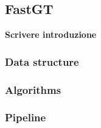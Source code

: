 \documentclass[../main.tex]{subfiles}
\begin{document}
\subsection{FastGT}
\label{fastgt}

\textbf{Scrivere introduzione}

\subsubsection{Data structure}
\subsubsection{Algorithms}
\subsubsection{Pipeline}
\end{document}
